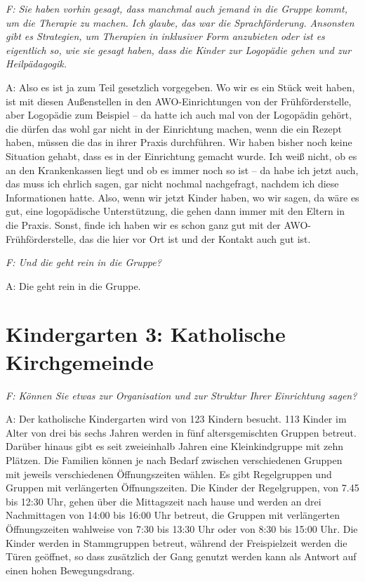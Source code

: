 \emph{F: Sie haben vorhin gesagt, dass manchmal auch jemand in die Gruppe kommt, um die Therapie zu machen. Ich glaube, das war die Sprachförderung. Ansonsten gibt es Strategien, um Therapien in inklusiver Form anzubieten oder ist es eigentlich so, wie sie gesagt haben, dass die Kinder zur Logopädie gehen und zur Heilpädagogik.}

A: Also es ist ja zum Teil gesetzlich vorgegeben. Wo wir es ein Stück weit haben, ist mit diesen Außenstellen in den AWO-Einrichtungen von der Frühförderstelle, aber Logopädie zum Beispiel -- da hatte ich auch mal von der Logopädin gehört, die dürfen das wohl gar nicht in der Einrichtung machen, wenn die ein Rezept haben, müssen die das in ihrer Praxis durchführen. Wir haben bisher noch keine Situation gehabt, dass es in der Einrichtung gemacht wurde. Ich weiß nicht, ob es an den Krankenkassen liegt und ob es immer noch so ist -- da habe ich jetzt auch, das muss ich ehrlich sagen, gar nicht nochmal nachgefragt, nachdem ich diese Informationen hatte. Also, wenn wir jetzt Kinder haben, wo wir sagen, da wäre es gut, eine logopädische Unterstützung, die gehen dann immer mit den Eltern in die Praxis. Sonst, finde ich haben wir es schon ganz gut mit der AWO-Frühförderstelle, das die hier vor Ort ist und der Kontakt auch gut ist.

\emph{F: Und die geht rein in die Gruppe?}

A: Die geht rein in die Gruppe. 
       
\section{Kindergarten 3: Katholische Kirchgemeinde}

\emph{F: Können Sie etwas zur Organisation und zur Struktur Ihrer Einrichtung sagen?}

A: Der katholische Kindergarten wird von 123 Kindern besucht. 113 Kinder im Alter von drei bis sechs Jahren werden in fünf altersgemischten Gruppen betreut. Darüber hinaus gibt es seit zweieinhalb Jahren eine Kleinkindgruppe mit zehn Plätzen. 
Die Familien können je nach Bedarf zwischen verschiedenen Gruppen mit jeweils verschiedenen Öffnungszeiten wählen. Es gibt Regelgruppen und Gruppen mit verlängerten Öffnungszeiten. Die Kinder der Regelgruppen, von 7.45 bis 12:30 Uhr, gehen über die Mittagszeit nach hause und werden an drei Nachmittagen von 14:00 bis 16:00 Uhr betreut, die Gruppen mit verlängerten Öffnungszeiten wahlweise von 7:30 bis 13:30 Uhr oder von 8:30 bis 15:00 Uhr. Die Kinder werden in Stammgruppen betreut, während der Freispielzeit werden die Türen geöffnet, so dass zusätzlich der Gang genutzt werden kann als Antwort auf einen hohen Bewegungsdrang.

